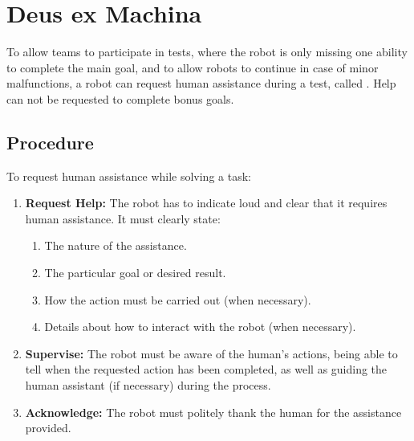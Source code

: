 \section{Deus ex Machina}
\label{sec:rules:deusexmachina}
To allow teams to participate in tests, where the robot is only missing one ability to complete the main goal, and to allow robots to continue in case of minor malfunctions, a robot can request human assistance during a test, called \DEM{}. Help can not be requested to complete bonus goals.

\subsection{Procedure}
\label{sec:rules:demprocedure}
To request human assistance while solving a task:

\begin{enumerate}
	\item \textbf{Request Help:} The robot has to indicate loud and clear that it requires human assistance. It must clearly state:
	\begin{enumerate}
		\item The nature of the assistance.
		\item The particular goal or desired result.
		\item How the action must be carried out (when necessary).
		\item Details about how to interact with the robot (when necessary).
	\end{enumerate}

	\item \textbf{Supervise:} The robot must be aware of the human's actions, being able to tell when the requested action has been completed, as well as guiding the human assistant (if necessary) during the process.

	\item \textbf{Acknowledge:} The robot must politely thank the human for the assistance provided.
\end{enumerate}


